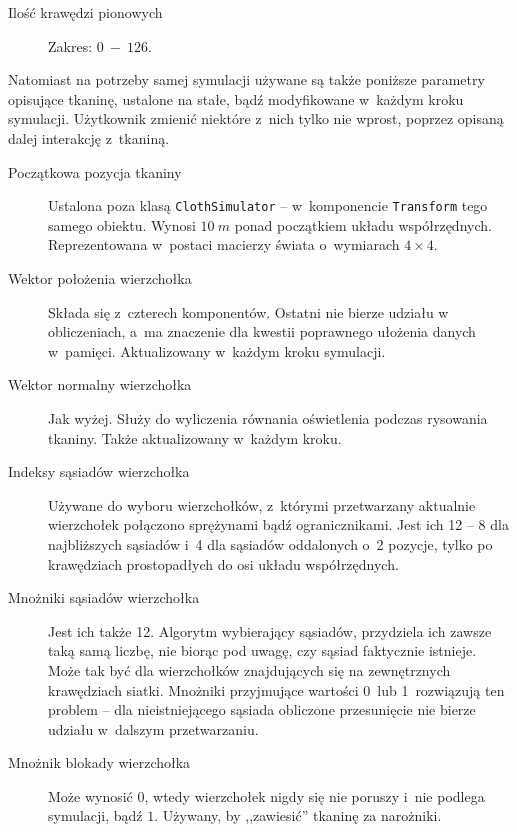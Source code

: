 \begin{description}
			\item[Ilość krawędzi pionowych] Zakres: \(0\ -\ 126\).
			
		\end{description}
		
		Natomiast na potrzeby samej symulacji używane są także poniższe parametry opisujące tkaninę, ustalone na stałe, bądź modyfikowane w~każdym kroku symulacji. Użytkownik zmienić niektóre z~nich tylko nie wprost, poprzez opisaną dalej interakcję z~tkaniną.
		
		\begin{description}
			
			\item[Początkowa pozycja tkaniny] Ustalona poza klasą \texttt{ClothSimulator} -- w~komponencie \texttt{Transform} tego samego obiektu. Wynosi \(10\ m\) ponad początkiem układu współrzędnych. Reprezentowana w~postaci macierzy świata o~wymiarach \(4\times4 \).
			
			\item[Wektor położenia wierzchołka] Składa się z~czterech komponentów. Ostatni nie bierze udziału w obliczeniach, a~ma znaczenie dla kwestii poprawnego ułożenia danych w~pamięci. Aktualizowany w~każdym kroku symulacji.
			
			\item[Wektor normalny wierzchołka] Jak wyżej. Służy do wyliczenia równania oświetlenia podczas rysowania tkaniny. Także aktualizowany w~każdym kroku.
			
			\item[Indeksy sąsiadów wierzchołka] Używane do wyboru wierzchołków, z~którymi przetwarzany aktualnie wierzchołek połączono sprężynami bądź ogranicznikami. Jest ich 12 -- 8 dla najbliższych sąsiadów i~4 dla sąsiadów oddalonych o~2 pozycje, tylko po krawędziach prostopadłych do osi układu współrzędnych. 
			
			\item[Mnożniki sąsiadów wierzchołka] Jest ich także 12. Algorytm wybierający sąsiadów, przydziela ich zawsze taką samą liczbę, nie biorąc pod uwagę, czy sąsiad faktycznie istnieje. Może tak być dla wierzchołków znajdujących się na zewnętrznych krawędziach siatki. Mnożniki przyjmujące wartości 0~lub 1~rozwiązują ten problem -- dla nieistniejącego sąsiada obliczone przesunięcie nie bierze udziału w~dalszym przetwarzaniu.
			
			\item[Mnożnik blokady wierzchołka] Może wynosić \(0\), wtedy wierzchołek nigdy się nie poruszy i~nie podlega symulacji, bądź \(1\). Używany, by ,,zawiesić'' tkaninę za narożniki.
			

\end{description}
